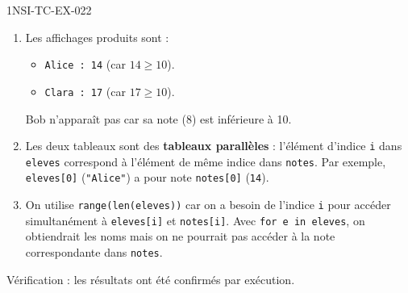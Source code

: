 \begin{corrige}{1NSI-TC-EX-022}
\begin{enumerate}
  \item Les affichages produits sont :
  \begin{itemize}
    \item \lstinline{Alice : 14} (car $14 \geq 10$).
    \item \lstinline{Clara : 17} (car $17 \geq 10$).
  \end{itemize}
  Bob n'apparaît pas car sa note ($8$) est inférieure à 10.

  \item Les deux tableaux sont des \textbf{tableaux parallèles} : l'élément d'indice \lstinline{i} dans \lstinline{eleves} correspond à l'élément de même indice dans \lstinline{notes}. Par exemple, \lstinline{eleves[0]} (\lstinline{"Alice"}) a pour note \lstinline{notes[0]} (\lstinline{14}).

  \item On utilise \lstinline{range(len(eleves))} car on a besoin de l'indice \lstinline{i} pour accéder simultanément à \lstinline{eleves[i]} et \lstinline{notes[i]}. Avec \lstinline{for e in eleves}, on obtiendrait les noms mais on ne pourrait pas accéder à la note correspondante dans \lstinline{notes}.
\end{enumerate}

Vérification : les résultats ont été confirmés par exécution.
\end{corrige}

